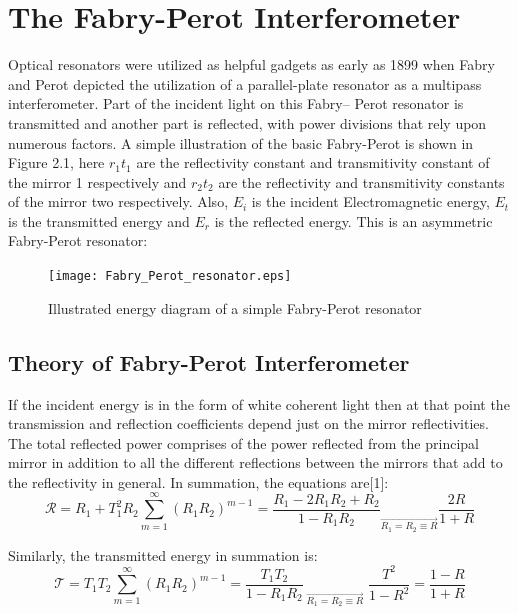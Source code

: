 \section{The Fabry-Perot Interferometer}
Optical resonators were utilized as helpful gadgets as early as 1899 when Fabry and Perot depicted the utilization of a parallel-plate resonator as a multipass interferometer. Part of the incident light on this Fabry– Perot resonator is transmitted and another part is reflected, with power divisions that rely upon numerous factors. A simple illustration of the basic Fabry-Perot is shown in Figure 2.1, here $r_{1} t_{1}$ are the reflectivity constant and transmitivity constant of the mirror 1 respectively and $r_{2} t_{2}$ are the reflectivity and transmitivity constants of the mirror two respectively. Also, $E_{i}$ is the incident Electromagnetic energy, $E_{t}$ is the transmitted energy and $E_{r}$ is the reflected energy. This is an asymmetric Fabry-Perot resonator:

\begin{figure}[h]
\centering
\texttt{[image: Fabry\_Perot\_resonator.eps]}
\caption{Illustrated energy diagram of a simple Fabry-Perot resonator}
\end{figure}



\newpage

\subsection{Theory of Fabry-Perot Interferometer}
 If the incident energy is in the form of white coherent light then at that point the transmission and reflection coefficients depend just on the mirror reflectivities. The total reflected power comprises of the power reflected from the principal mirror in addition to all the different reflections between the mirrors that add to the reflectivity in general. In summation, the equations are[1]: 
\begin{equation}
{\mathcal R} = R_{1} + T_{1}^2 R_{2} \sum_{m=1}^{\infty} (R_{1}R_{2})^{m-1} = \frac{R_{1} - 2R_{1}R_{2} + R_{2}}{1 - R_{1}R_{2}} _{\overrightarrow{R_{1} = R_{2} \equiv R}} \frac{2R}{1+R}
\end{equation}

Similarly, the transmitted energy in summation is:
\begin{equation}
{\mathcal T} = T_{1} T_{2} \sum_{m=1}^{\infty} (R_{1}R_{2})^{m-1} = \frac{T_{1} T_{2}}{1 - R_{1}R_{2}} _{\; \overrightarrow{R_{1} = R_{2} \equiv R}} \; \frac{T^{2}}{1-R^{2}} = \frac{1-R}{1+R}
\end{equation}

